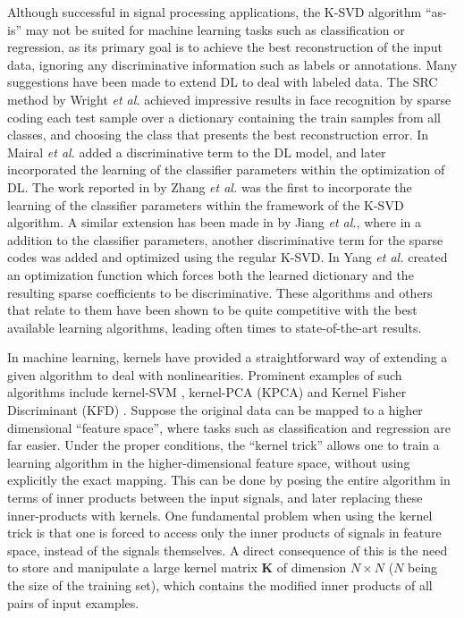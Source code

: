 \documentclass[journal]{IEEEtran}
\newcommand{\bK}{\mathbf{K}}
\begin{document}
Although successful in signal processing applications, the K-SVD algorithm ``as-is'' may not be suited for machine learning tasks such as classification or regression, as its primary goal is to achieve the best reconstruction of the input data, ignoring any discriminative information such as labels or annotations.
Many suggestions have been made to extend DL to deal with labeled data. The SRC method by Wright \textit{et al.} \cite{Classification} achieved impressive results in face recognition by sparse coding each test sample over a dictionary containing the train samples from all classes, and choosing the class that presents the best reconstruction error. In \cite{SupevisedDic1,SupevisedDic2} Mairal \textit{et al.} added a discriminative term to the DL model, and later incorporated the learning of the classifier parameters within the optimization of DL. The work reported in \cite{DKSVD} by Zhang \textit{et al.} was the first to incorporate the learning of the classifier parameters within the framework of the K-SVD algorithm. A similar extension has been made in \cite{LCKSVD,LCKSVD2} by Jiang \textit{et al.}, where in a addition to the classifier parameters, another discriminative term for the sparse codes was added and optimized using the regular K-SVD. In \cite{FDDL} Yang \textit{et al.} created an optimization function which forces both the learned dictionary and the resulting sparse coefficients to be discriminative. These algorithms and others that relate to them have been shown to be quite competitive with the best available learning algorithms, leading often times to state-of-the-art results.

In machine learning, kernels have provided a straightforward way of extending a given algorithm to deal with nonlinearities. Prominent examples of such algorithms include kernel-SVM \cite{KSVM}, kernel-PCA (KPCA) \cite{KPCA} and Kernel Fisher Discriminant (KFD) \cite{KFD}. Suppose the original data can be mapped to a higher dimensional ``feature space'', where tasks such as classification and regression are far easier. Under the proper conditions, the ``kernel trick'' allows one to train a learning algorithm in the higher-dimensional feature space, without using explicitly the exact mapping. This can be done by posing the entire algorithm in terms of inner products between the input signals, and later replacing these inner-products with kernels. One fundamental problem when using the kernel trick is that one is forced to access only the inner products of signals in feature space, instead of the signals themselves. A direct consequence of this is the need to store and manipulate a large kernel matrix $\bK$ of dimension $N \times N$ ($N$ being the size of the training set), which contains the modified inner products of all pairs of input examples.
\end{document}
